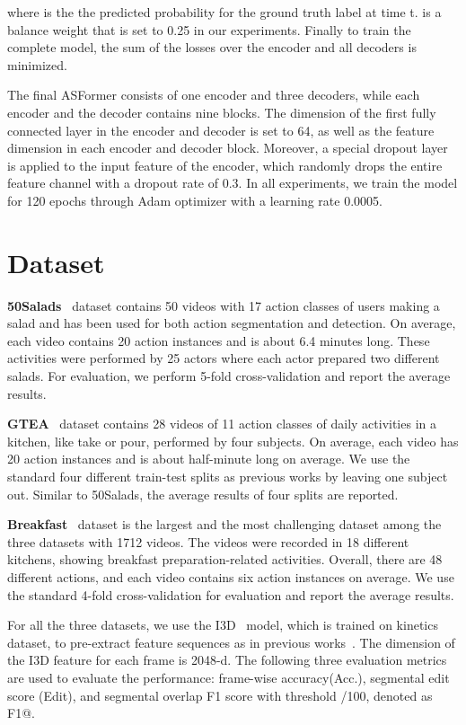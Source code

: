 \documentclass{bmvc2k}
\begin{document}
where  is the the predicted probability for the ground truth label  at time t.  is a balance weight that is set to 0.25 in our experiments. Finally to train the complete model, the sum of the losses over the encoder and all decoders is minimized.

The final ASFormer consists of one encoder and three decoders, while each encoder and the decoder contains nine blocks. The dimension of the first fully connected layer in the encoder and decoder is set to 64, as well as the feature dimension in each encoder and decoder block. Moreover, a special dropout layer is applied to the input feature of the encoder, which randomly drops the entire feature channel with a dropout rate of 0.3.  In all experiments, we train the model for 120 epochs through Adam optimizer with a learning rate 0.0005.


\section{Dataset}

\textbf{50Salads}~\cite{50salads} dataset contains 50 videos with 17 action classes of users making a salad and has been used for both action segmentation and detection. On average, each video contains 20 action instances and is about 6.4 minutes long. These activities were performed by 25 actors where each actor prepared two different salads. For evaluation, we perform 5-fold cross-validation and report the average results.

\noindent
\textbf{GTEA}~\cite{gtea} dataset contains 28 videos of 11 action classes of daily activities in a kitchen, like take or pour, performed by four subjects. On average, each video has 20 action instances and is about half-minute long on average. We use the standard four different train-test splits as previous works by leaving one subject out. Similar to 50Salads, the average results of four splits are reported.

\noindent
\textbf{Breakfast}~\cite{breakfast} dataset is the largest and the most challenging dataset among the three datasets with 1712 videos. The videos were recorded in 18 different kitchens, showing breakfast preparation-related activities. Overall, there are 48 different actions, and each video contains six action instances on average. We use the standard 4-fold cross-validation for evaluation and report the average results.

\noindent
For all the three datasets, we use the I3D~\cite{kinetics:i3d} model, which is trained on kinetics~\cite{kinetics:i3d} dataset, to pre-extract feature sequences as in previous works~\cite{MSTCN,Dai,BCN,GCN1,GCN2,ED-TCN}. The dimension of the I3D feature for each frame is 2048-d. The following three evaluation metrics are used to evaluate the performance: frame-wise accuracy(Acc.), segmental edit score (Edit), and segmental overlap F1 score with threshold /100, denoted as F1@. 
\end{document}
